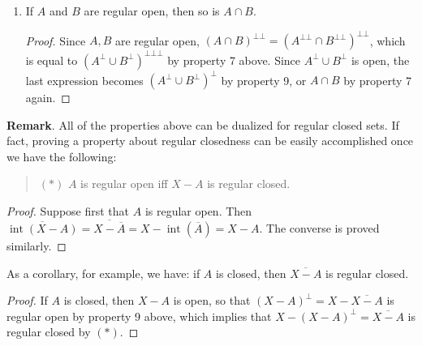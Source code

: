 \documentclass[12pt]{article}
\begin{document}
\begin{enumerate}
\begin{proof}
Since $A\subseteq A^-$ for any set, $A^{-c}\subseteq A^c$.  This means $A^{-c-}\subseteq A^{c-}$.  Since $A$ is open, $A^c$ is closed, so that $A^{c-}=A^c$.  The last inclusion becomes $A^{-c-}\subseteq A^c$.  Taking complement again, we have 
\begin{equation}
A\subseteq A^{-c-c}.
\end{equation}
Since $^\bot=^{-c}$ reverses inclusion, we have $A^{-c-c-c}\subseteq A^{-c}$, which is one of the inclusions.  On the other hand, the inclusion (1) above applies to \emph{any} open set, and because $A^{-c}$ is open, $A^{-c}\subseteq A^{-c-c-c}$, which is the other inclusion.
\end{proof}
\item If $A$ and $B$ are regular open, then so is $A\cap B$.
\begin{proof}  Since $A,B$ are regular open, $(A\cap B)^{\bot\bot}= (A^{\bot\bot}\cap B^{\bot\bot})^{\bot\bot}$, which is equal to $(A^\bot \cup B^\bot)^{\bot\bot\bot}$ by property 7 above.  Since $A^\bot \cup B^\bot$ is open, the last expression becomes $(A^\bot \cup B^\bot)^\bot$ by property 9, or $A\cap B$ by property 7 again.
\end{proof}
\end{enumerate}

\textbf{Remark}.  All of the properties above can be dualized for regular closed sets.  If fact, proving a property about regular closedness can be easily accomplished once we have the following: 
\begin{quote}\begin{center}
$(*)$ $A$ is regular open iff $X-A$ is regular closed.
\end{center}\end{quote}
\begin{proof}
Suppose first that $A$ is regular open.  Then $\overline{\operatorname{int}(X-A)} = \overline{X-\overline{A}}=X-\operatorname{int}(\overline{A})=X-A$.  The converse is proved similarly.
\end{proof}
As a corollary, for example, we have: if $A$ is closed, then $\overline{X-A}$ is regular closed.
\begin{proof}
If $A$ is closed, then $X-A$ is open, so that $(X-A)^\bot=X-\overline{X-A}$ is regular open by property 9 above, which implies that $X-(X-A)^\bot = \overline{X-A}$ is regular closed by $(*)$.
\end{proof}
\end{document}
